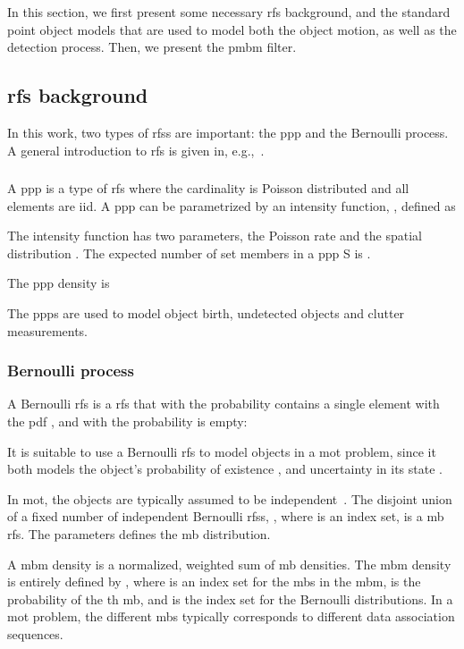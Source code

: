 \documentclass[conference]{IEEEtran}
\begin{document}
In this section, we first present some necessary \gls{rfs} background, and the standard point object models that are used to model both the object motion, as well as the detection process. Then, we present the \gls{pmbm} filter.



\subsection{\gls{rfs} background}
In this work, two types of \glspl{rfs} are important: the \gls{ppp} and the Bernoulli process. A general introduction to \gls{rfs} is given in, e.g.,~\cite{Mahler2007}.

\subsubsection{}
A \gls{ppp} is a type of \gls{rfs} where the cardinality is Poisson
distributed and all elements are \gls{iid}.
A \gls{ppp} can be parametrized by an intensity function, , defined as

The intensity function has two parameters, the Poisson rate  and the spatial distribution .
The expected number of set members in a \gls{ppp} S is .

The \gls{ppp} density is

The \glspl{ppp} are used to model object birth, undetected
objects and clutter measurements.

\subsubsection{Bernoulli process}
A Bernoulli \gls{rfs} is a \gls{rfs} that with the probability  contains a single element with the \gls{pdf} , and with the probability  is empty:

It is suitable to use a Bernoulli \gls{rfs} to model objects in a \gls{mot} problem, since it both models the object's probability of existence , and uncertainty in its state .


In \gls{mot}, the objects are typically assumed to be
independent~\cite{Williams2015}.
The disjoint union of a fixed number of independent Bernoulli \glspl{rfs},
, where 
is an index set, is a \gls{mb} \gls{rfs}.
The parameters 
defines the \gls{mb} distribution.

A \gls{mbm} density is a normalized, weighted sum of \gls{mb} densities.
The \gls{mbm} density is entirely defined by , where  is an index set for the \glspl{mb} in the \gls{mbm},  is the probability of the th \gls{mb}, and  is the index set for the Bernoulli distributions.
In a \gls{mot} problem, the different \glspl{mb} typically corresponds
to different data association sequences.
\end{document}
